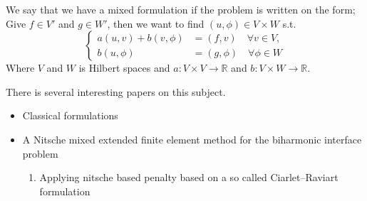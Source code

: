 
We say that we have a mixed formulation if the problem is written on the form; Give $f \in V' $  and $g \in W' $, then we want to find $( u, \phi ) \in V \times W$  s.t. \[
    \begin{cases}
       a( u,v) + b ( v, \phi )  & = ( f,v)  \quad  \forall v \in V, \\
       b( u, \phi )  & = ( g, \phi )    \quad \forall \phi \in W
    \end{cases}
\]
Where $V$  and $W$  is Hilbert spaces and $a: V\times V \to \mathbb{R}  $ and $b: V \times W \to \mathbb{R} $.

There is several interesting papers on this subject.
\begin{itemize}
    \item Classical formulations \cite{babuvska1980analysis}
    \item  A Nitsche mixed extended finite element method for the biharmonic interface problem \cite{cai2023nitsche}
        \begin{enumerate}[label=\arabic*)]
            \item Applying nitsche based penalty based on a so called Ciarlet–Raviart formulation
        \end{enumerate}
\end{itemize}






